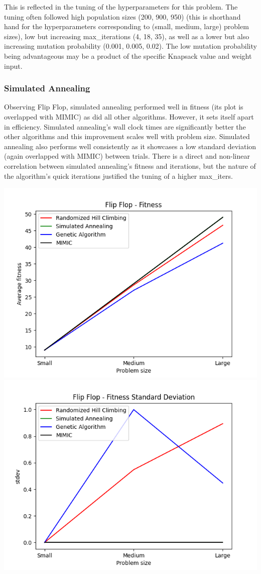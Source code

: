 \documentclass{article}
\begin{document}
This is reflected in the tuning of the hyperparameters for this problem. The tuning often followed high population sizes (200, 900, 950) (this is shorthand hand for the hyperparameters corresponding to (small, medium, large) problem sizes), low but increasing max\_iterations (4, 18, 35), as well as a lower but also increasing mutation probability (0.001, 0.005, 0.02). The low mutation probability being advantageous may be a product of the specific Knapsack value and weight input.

\subsubsection{Simulated Annealing}

Observing Flip Flop, simulated annealing performed well in fitness (its plot is overlapped with MIMIC) as did all other algorithms. However, it sets itself apart in efficiency. Simulated annealing's wall clock times are significantly better the other algorithms and this improvement scales well with problem size. Simulated annealing also performs well consistently as it showcases a low standard deviation (again overlapped with MIMIC) between trials. There is a direct and non-linear correlation between simulated annealing's fitness and iterations, but the nature of the algorithm's quick iterations justified the tuning of a higher max\_iters.

\begin{center}
    \includegraphics[width=.49\linewidth]{flip_flop_fitness.png}
    \includegraphics[width=.49\linewidth]{flip_flop_stdev.png}
\end{center}
\end{document}
